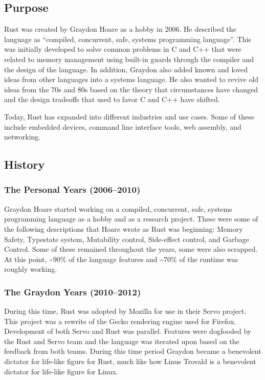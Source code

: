 \documentclass{article}
\begin{document}
  \subsection{Purpose}
  Rust was created by Graydon Hoare as a hobby in 2006. He described the
  language as “compiled, concurrent, safe, systems programming language”. This
  was initially developed to solve common problems in C and C++ that were
  related to memory management using built-in guards through the compiler and
  the design of the language. In addition, Graydon also added known and loved
  ideas from other languages into a systems language. He also wanted to revive
  old ideas from the 70s and 80s based on the theory that circumstances have
  changed and the design tradeoffs that used to favor C and C++ have shifted.

  Today, Rust has expanded into different industries and use cases. Some of
  these include embedded devices, command line interface tools, web assembly,
  and networking.

  \subsection{History}
  \subsubsection{The Personal Years (2006--2010)}
  Graydon Hoare started working on a compiled, concurrent, safe, systems
  programming language as a hobby and as a research project. These were some of
  the following descriptions that Hoare wrote as Rust was beginning: Memory
  Safety, Typestate system, Mutability control, Side-effect control, and Garbage
  Control. Some of these remained throughout the years, some were also scrapped.
  At this point, \textasciitilde90\% of the language features and
  \textasciitilde70\% of the runtime was roughly working.

  \subsubsection{The Graydon Years (2010--2012)}
  During this time, Rust was adopted by Mozilla for use in their Servo project.
  This project was a rewrite of the Gecko rendering engine used for Firefox.
  Development of both Servo and Rust was parallel. Features were dogfooded by
  the Rust and Servo team and the language was iterated upon based on the
  feedback from both teams. During this time period Graydon became a benevolent
  dictator for life-like figure for Rust, much like how Linus Trovald is a
  benevolent dictator for life-like figure for Linux.
\end{document}
